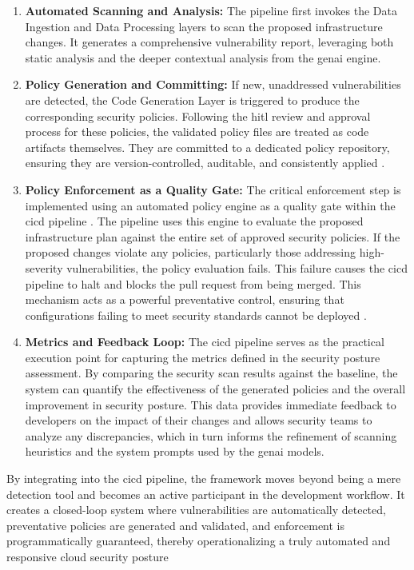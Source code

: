 \begin{enumerate}
\item \textbf{Automated Scanning and Analysis:} The pipeline first invokes the Data Ingestion and Data Processing layers to scan the proposed infrastructure changes. It generates a comprehensive vulnerability report, leveraging both static analysis and the deeper contextual analysis from the \gls{genai} engine.
\item \textbf{Policy Generation and Committing:} If new, unaddressed vulnerabilities are detected, the Code Generation Layer is triggered to produce the corresponding security policies. Following the \gls{hitl} review and approval process for these policies, the validated policy files are treated as code artifacts themselves. They are committed to a dedicated policy repository, ensuring they are version-controlled, auditable, and consistently applied \cite{sarathe_krisshnan_jutoo_vijayaraghavan_policy_2025}.
\item \textbf{Policy Enforcement as a Quality Gate:} The critical enforcement step is implemented using an automated policy engine as a quality gate within the \gls{cicd} pipeline \cite{noauthor_streamlining_nodate}. The pipeline uses this engine to evaluate the proposed infrastructure plan against the entire set of approved security policies. If the proposed changes violate any policies, particularly those addressing high-severity vulnerabilities, the policy evaluation fails. This failure causes the \gls{cicd} pipeline to halt and blocks the pull request from being merged. This mechanism acts as a powerful preventative control, ensuring that configurations failing to meet security standards cannot be deployed \cite{sarathe_krisshnan_jutoo_vijayaraghavan_policy_2025} \cite{noauthor_streamlining_nodate}.
\item \textbf{Metrics and Feedback Loop:} The \gls{cicd} pipeline serves as the practical execution point for capturing the metrics defined in the security posture assessment. By comparing the security scan results against the baseline, the system can quantify the effectiveness of the generated policies and the overall improvement in security posture. This data provides immediate feedback to developers on the impact of their changes and allows security teams to analyze any discrepancies, which in turn informs the refinement of scanning heuristics and the system prompts used by the \gls{genai} models.
\end{enumerate}

By integrating into the \gls{cicd} pipeline, the framework moves beyond being a mere detection tool and becomes an active participant in the development workflow. It creates a closed-loop system where vulnerabilities are automatically detected, preventative policies are generated and validated, and enforcement is programmatically guaranteed, thereby operationalizing a truly automated and responsive cloud security posture  \cite{noauthor_streamlining_nodate}